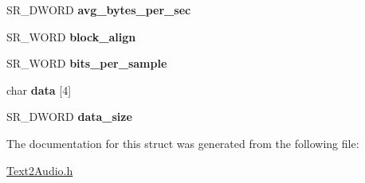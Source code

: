 \begin{DoxyCompactItemize}
\item 
\hypertarget{structwave__pcm__hdr_a49c5b2a1cb1299bc0a6e76ba6535c22e}{\-S\-R\-\_\-\-D\-W\-O\-R\-D {\bfseries avg\-\_\-bytes\-\_\-per\-\_\-sec}}\label{structwave__pcm__hdr_a49c5b2a1cb1299bc0a6e76ba6535c22e}

\item 
\hypertarget{structwave__pcm__hdr_a8ac57d2f0aaba6d9eb9269bf787cc132}{\-S\-R\-\_\-\-W\-O\-R\-D {\bfseries block\-\_\-align}}\label{structwave__pcm__hdr_a8ac57d2f0aaba6d9eb9269bf787cc132}

\item 
\hypertarget{structwave__pcm__hdr_a055e7b75cb19c64caf3e600a5ef25611}{\-S\-R\-\_\-\-W\-O\-R\-D {\bfseries bits\-\_\-per\-\_\-sample}}\label{structwave__pcm__hdr_a055e7b75cb19c64caf3e600a5ef25611}

\item 
\hypertarget{structwave__pcm__hdr_a2fe90d6b3105e7bc15f134699a96b077}{char {\bfseries data} \mbox{[}4\mbox{]}}\label{structwave__pcm__hdr_a2fe90d6b3105e7bc15f134699a96b077}

\item 
\hypertarget{structwave__pcm__hdr_ad7412510bc75fa021dbde452b0379acf}{\-S\-R\-\_\-\-D\-W\-O\-R\-D {\bfseries data\-\_\-size}}\label{structwave__pcm__hdr_ad7412510bc75fa021dbde452b0379acf}

\end{DoxyCompactItemize}


\-The documentation for this struct was generated from the following file\-:\begin{DoxyCompactItemize}
\item 
\hyperlink{Text2Audio_8h}{\-Text2\-Audio.\-h}\end{DoxyCompactItemize}
